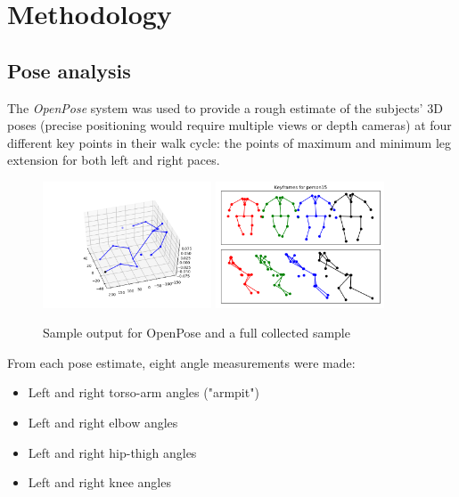 \documentclass{bmvc2k}
\begin{document}
\section{Methodology}

\subsection{Pose analysis}

The \textit{OpenPose}\cite{op1}\cite{op2}\cite{op3}\cite{op4} system was used to provide a rough estimate of the subjects' 3D poses (precise positioning would require multiple views or depth cameras) at four different key points in their walk cycle: the points of maximum and minimum leg extension for both left and right paces.

\begin{figure}[H]
   \begin{center}
      \includegraphics[width=5cm]{figures/OPOut.png}
      \includegraphics[width=5cm]{figures/walkdata.png}\\
   \end{center}
   \caption{Sample output for OpenPose and a full collected sample}
\end{figure}

From each pose estimate, eight angle measurements were made:

\begin{itemize}
   \item Left and right torso-arm angles ("armpit")
   \item Left and right elbow angles
   \item Left and right hip-thigh angles
   \item Left and right knee angles
\end{itemize}
\end{document}
